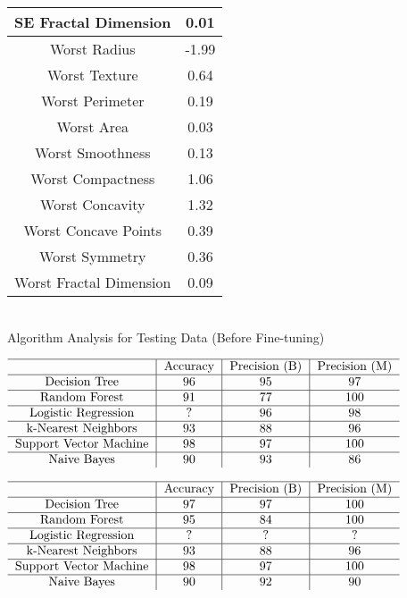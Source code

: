\documentclass[conference]{IEEEtran}
\begin{document}
\begin{table*}
\begin{tabular}{c|c}
             \hline
             SE Fractal Dimension & 0.01\\
             \hline
             Worst Radius & -1.99\\
             \hline
             Worst Texture & 0.64\\
             \hline
             Worst Perimeter & 0.19\\
             \hline
             Worst Area & 0.03\\
             \hline
             Worst Smoothness & 0.13\\
             \hline
             Worst Compactness & 1.06\\
             \hline
             Worst Concavity & 1.32\\
             \hline
             Worst Concave Points & 0.39\\
             \hline
             Worst Symmetry & 0.36\\
             \hline
             Worst Fractal Dimension & 0.09
        \end{tabular}

\end{table*}

\begin{table*}
    \centering
    \caption{\\Algorithm Analysis for Testing Data (Before Fine-tuning)}
    $\begin{tabular}{c|c|c|c}
        \hline
        & Accuracy & Precision (B) & Precision (M)\\
        \hline
        Decision Tree & 96 & 95 & 97 \\
        \hline
        Random Forest & 91 & 77 & 100\\
        \hline
        Logistic Regression & ? & 96 & 98 \\
        \hline
        k-Nearest Neighbors & 93 & 88 & 96\\
        \hline
        Support Vector Machine & 98 & 97 & 100 \\
        \hline
        Naive Bayes & 90 & 93 & 86\\
    \end{tabular}$

    \caption{\\Algorithm Analysis for Testing Data ({\textbf After Fine-tuning})}
    $\begin{tabular}{c|c|c|c}
        \hline
        & Accuracy & Precision (B) & Precision (M)\\
        \hline
        Decision Tree & 97 & 97 & 100 \\
        \hline
        Random Forest & 95 & 84 & 100\\
        \hline
        Logistic Regression & ? & ? & ? \\
        \hline
        k-Nearest Neighbors & 93 & 88 & 96\\
        \hline
        Support Vector Machine & 98 & 97 & 100 \\
        \hline
        Naive Bayes & 90 & 92 & 90\\
    \end{tabular}$

\end{table*}
\end{document}

